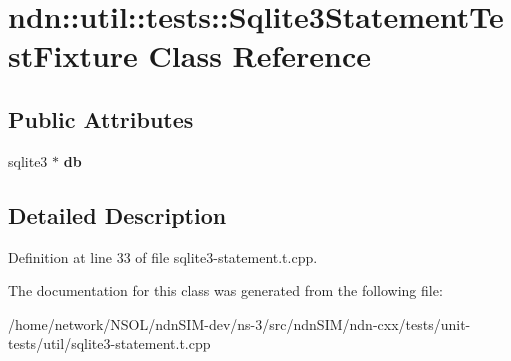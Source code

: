 \hypertarget{classndn_1_1util_1_1tests_1_1Sqlite3StatementTestFixture}{}\section{ndn\+:\+:util\+:\+:tests\+:\+:Sqlite3\+Statement\+Test\+Fixture Class Reference}
\label{classndn_1_1util_1_1tests_1_1Sqlite3StatementTestFixture}
\subsection*{Public Attributes}
\begin{DoxyCompactItemize}
\item 
sqlite3 $\ast$ {\bfseries db}\hypertarget{classndn_1_1util_1_1tests_1_1Sqlite3StatementTestFixture_a9f2c9bd08b86e884b89340b610e83f3a}{}\label{classndn_1_1util_1_1tests_1_1Sqlite3StatementTestFixture_a9f2c9bd08b86e884b89340b610e83f3a}

\end{DoxyCompactItemize}


\subsection{Detailed Description}


Definition at line 33 of file sqlite3-\/statement.\+t.\+cpp.



The documentation for this class was generated from the following file\+:\begin{DoxyCompactItemize}
\item 
/home/network/\+N\+S\+O\+L/ndn\+S\+I\+M-\/dev/ns-\/3/src/ndn\+S\+I\+M/ndn-\/cxx/tests/unit-\/tests/util/sqlite3-\/statement.\+t.\+cpp\end{DoxyCompactItemize}
